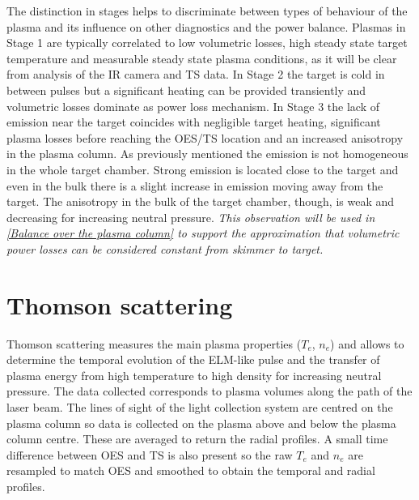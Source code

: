 The distinction in stages helps to discriminate between types of behaviour of the plasma and its influence on other diagnostics and the power balance. Plasmas in Stage 1 are typically correlated to low volumetric losses, high steady state target temperature and measurable steady state plasma conditions, as it will be clear from analysis of the IR camera and TS data. In Stage 2 the target is cold in between pulses but a significant heating can be provided transiently and volumetric losses dominate as power loss mechanism. In Stage 3 the lack of emission near the target coincides with negligible target heating, significant plasma losses before reaching the OES/TS location and an increased anisotropy in the plasma column.
As previously mentioned the emission is not homogeneous in the whole target chamber. Strong emission is located close to the target and even in the bulk there is a slight increase in emission moving away from the target. The anisotropy in the bulk of the target chamber, though, is weak and decreasing for increasing neutral pressure. \emph{This observation will be used in \autoref{Balance over the plasma column} to support the approximation that volumetric power losses can be considered constant from skimmer to target.}



\section{Thomson scattering}\label{Thomson scattering}


Thomson scattering measures the main plasma properties ($T_e$, $n_e$) and allows to determine the temporal evolution of the ELM-like pulse and the transfer of plasma energy from high temperature to high density for increasing neutral pressure. The data collected corresponds to plasma volumes along the path of the laser beam. The lines of sight of the light collection system are centred on the plasma column so data is collected on the plasma above and below the plasma column centre. These are averaged to return the radial profiles. A small time difference between OES and TS is also present so the raw $T_e$ and $n_e$ are resampled to match OES and smoothed to obtain the temporal and radial profiles.

